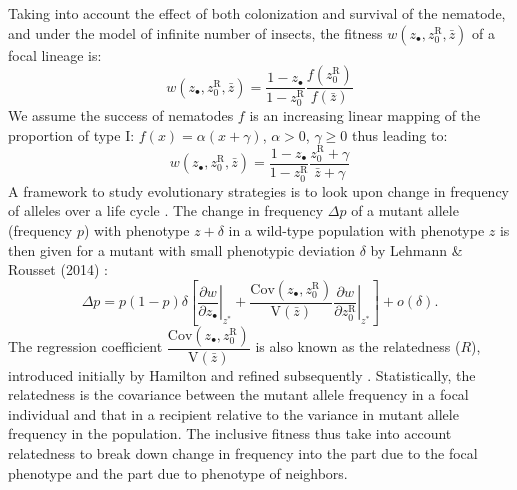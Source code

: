 \documentclass[10pt]{article}
\begin{document}
\begin{multicols}{2}
  Taking into account the effect of both colonization and survival of the nematode, and under the model of infinite number of insects, the fitness $w(z_\bullet ,z_0^{\mathrm{R}} , \bar{z} )$ of a focal lineage is:
  \begin{equation}
  w(z_\bullet ,z_0^{\mathrm{R}} , \bar{z} ) = \dfrac{1- z_\bullet}{1-z_0^{\mathrm{R}}}\dfrac{f(z_0^{\mathrm{R}}) }{f(\bar{z})}
  \end{equation}
   We assume the success of nematodes $f$ is an increasing linear mapping of the proportion of type I: $f (x)=\alpha (x+\gamma)$, $\alpha>0$, $\gamma \geq 0$ thus leading to:
  \begin{equation}
  w(z_\bullet ,z_0^{\mathrm{R}} , \bar{z} ) = \dfrac{1- z_\bullet}{1-z_0^{\mathrm{R}}}\dfrac{ z_0^{\mathrm{R}} + \gamma }{ \bar{z} + \gamma}
  \end{equation}
  A framework to study evolutionary strategies is to look upon change in frequency of alleles over a life cycle \cite{Rousset2010Thegeneticaltheory,lehmann2014fitness}.
The change in frequency $\Delta p$ of a mutant allele (frequency $p$) with phenotype $z+\delta$ in a wild-type
population with phenotype $z$ is then given for a mutant with small phenotypic deviation $\delta$ by Lehmann \& Rousset (2014) \cite{lehmann2014fitness}:
  \begin{equation}
  \Delta p = p (1-p) \delta \left[ \left. \dfrac{\partial w}{\partial z_\bullet} \right\vert_{z^*} +  \dfrac{\mathrm{Cov}(z_\bullet,z_0^{\mathrm{R}})}{\mathrm{V}(\bar{z})} \left. \dfrac{\partial w}{\partial z_0^{\mathrm{R}}} \right\vert_{z^*} \right] + o ( \delta ).  \label{invasion}
  \end{equation}
  The regression coefficient $\dfrac{\mathrm{Cov}(z_\bullet,z_0^{\mathrm{R}})}{\mathrm{V}(\bar{z})}$ is also known as the relatedness ($R$), introduced initially by Hamilton \cite{Hamilton1964} and refined subsequently \cite{Lehmann2010a}. Statistically, the relatedness is the covariance between the mutant allele frequency in a focal individual and that in a recipient relative to the variance in mutant allele frequency in the population. 
The inclusive fitness thus take into account relatedness to break down change in frequency into the part due to the focal phenotype and the part due to phenotype of neighbors.


\end{multicols}
\end{document}
